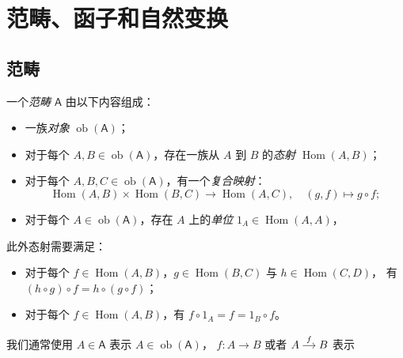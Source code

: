 \documentclass[fontset=none]{Notes}
\DeclareMathOperator\Hom{Hom}
\DeclareMathOperator\ob{ob}
\newcommand{\cat}[1]{\mathsf{#1}}
\begin{document}
\frontmatter

\tableofcontents

\mainmatter

\chapter{范畴、函子和自然变换}

\section{范畴}

\begin{definition}
  一个\emph{范畴} $\cat{A}$ 由以下内容组成：
  \begin{itemize}[nosep]
    \item 一族\emph{对象} $\ob(\cat A)$；
    \item 对于每个 $A,B\in\ob(\cat A)$，存在一族从 $A$ 到 $B$ 的\emph{态射}
    $\Hom(A,B)$；
    \item 对于每个 $A,B,C\in\ob(\cat A)$，有一个\emph{复合映射}：
    \[
      \Hom(A,B)\times \Hom(B,C)\to \Hom(A,C),
      \quad (g,f)\mapsto g\circ f;
    \]
    \item 对于每个 $A\in\ob(\cat A)$，存在 $A$ 上的\emph{单位}
    $1_A\in\Hom(A,A)$，
  \end{itemize}
  此外态射需要满足：
  \begin{itemize}[nosep]
    \item 对于每个 $f\in\Hom(A,B)$，$g\in\Hom(B,C)$ 与 $h\in\Hom(C,D)$，
    有 $(h\circ g)\circ f=h\circ(g\circ f)$；
    \item 对于每个 $f\in \Hom(A,B)$，有 $f\circ 1_A=f=1_B\circ f$。
  \end{itemize}
\end{definition}

\begin{remark}
  我们通常使用 $A\in \cat A$ 表示 $A\in\ob(\cat A)$，
  $f:A\to B$ 或者
  $
    \begin{tikzcd}[cramped,sep=small]
      A\arrow[r,"f"] & B
    \end{tikzcd}
  $
  表示
\end{remark}
\end{document}
